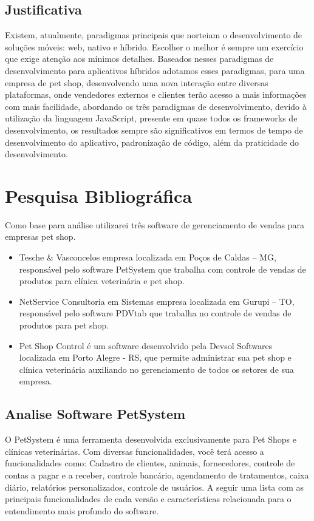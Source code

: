 \documentclass[12pt,openright,twoside,a4paper,english,french,spanish,brazil]{abntex2}
\begin{document}
\section*{Justificativa}
Existem, atualmente, paradigmas principais que norteiam o desenvolvimento de soluções móveis: web, nativo e híbrido. Escolher o melhor é sempre um exercício que exige atenção aos mínimos detalhes.
Baseados nesses paradigmas de desenvolvimento para aplicativos híbridos adotamos esses paradigmas, para uma empresa de pet shop, desenvolvendo uma nova interação entre diversas plataformas, onde vendedores externos e clientes terão acesso a mais informações com mais facilidade, abordando os três paradigmas de desenvolvimento, devido à utilização da linguagem JavaScript, presente em quase todos os frameworks de desenvolvimento, os resultados sempre são significativos em termos de tempo de desenvolvimento do aplicativo, padronização de código, além da praticidade do desenvolvimento.

\chapter*[Pesquisa Bibliográfica]{Pesquisa Bibliográfica}

Como base para análise utilizarei três software de gerenciamento de vendas para empresas pet shop.

\begin{itemize}
\item Tesche \& Vasconcelos empresa localizada em Poços de Caldas – MG, responsável pelo software PetSystem que trabalha com controle de vendas de produtos para clínica veterinária e pet shop.
\item NetService Consultoria em Sistemas empresa localizada em Gurupi – TO, responsável pelo software PDVtab que trabalha no controle de vendas de produtos para pet shop.
\item Pet Shop Control é um software desenvolvido pela Devsol Softwares localizada em Porto Alegre - RS, que permite administrar sua pet shop e clínica veterinária auxiliando no gerenciamento de todos os setores de sua empresa.
\end{itemize}

\section*{Analise Software PetSystem}
O PetSystem é uma ferramenta desenvolvida exclusivamente para Pet Shops e clínicas veterinárias. Com diversas funcionalidades, você terá acesso a funcionalidades como: Cadastro de clientes, animais, fornecedores, controle de contas a pagar e a receber, controle bancário, agendamento de tratamentos, caixa diário, relatórios personalizados, controle de usuários. A seguir uma lista com as principais funcionalidades de cada versão e características relacionada para o entendimento mais profundo do software.
\end{document}
